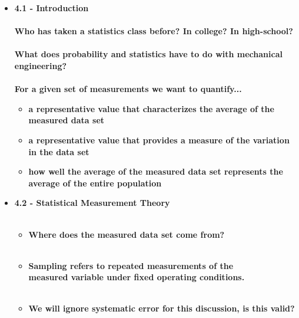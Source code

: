 \documentclass[11pt]{article}
\newcommand{\R}{\color{red}}
\newcommand{\B}{\color{blue}}
\newcommand{\PR}{\color{mypurple}}
\begin{document}
\begin{itemize}


	\item \textbf{ \LARGE 4.1 -  Introduction  } \\\\
	
		\textbf{\Large Who has taken a statistics class before? In college? In high-school?} \\\\
		 
		\textbf{\Large What does probability and statistics have to do with mechanical engineering?} \\\\
		
		
		 \textbf{\Large For a given set of measurements we want to quantify...}
		
		\begin{itemize}
			\item \textbf{\Large a representative value that characterizes the average of the measured data set} \vspace{5mm}
			\item \textbf{\Large a representative value that provides a measure of the variation in the data set} \vspace{5mm}
			\item \textbf{\Large how well the average of the measured data set represents the average of the entire population}  \vspace{5mm}
		\end{itemize}
		
		\newpage
		
	\item \textbf{ \Large 4.2 -  Statistical Measurement Theory  } \\\\
	\begin{itemize}
		\item \textbf{ \Large Where does the measured data set come from?  } \\\\
		\item \textbf{ \Large {\bf \R Sampling} refers to repeated measurements of the \\ {\bf \PR measured variable} under fixed operating conditions. } \\\\
		\item \textbf{ \Large We will ignore {\bf \B systematic error} for this discussion, is this valid? } \\\\
		

\end{itemize}
\end{itemize}
\end{document}
